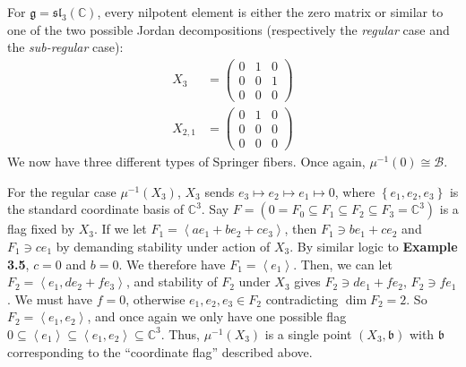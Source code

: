 \documentclass[11pt]{article}
\newcommand{\C}{\mathbb{C}}
\theoremstyle{definition}
\numberwithin{equation}{section} %
\begin{document}
\begin{example}
    For $\mathfrak{g} = \mathfrak{sl}_3(\C)$, every nilpotent element is either the zero matrix or similar to one of the two possible Jordan decompositions (respectively the \emph{regular} case and the \emph{sub-regular} case):
    \begin{align*}
    X_3 &= \begin{pmatrix} 0 & 1 & 0 \\ 0 & 0 & 1 \\ 0 & 0 & 0 \end{pmatrix} \\ 
    X_{2,1} &= \begin{pmatrix} 0 & 1 & 0 \\ 0 & 0 & 0 \\ 0 & 0 & 0 \end{pmatrix}
    \end{align*}
    We now have three different types of Springer fibers. Once again, $\mu^{-1}(0) \cong \mathcal{B}$. 
    
    \smallskip
    
    \noindent For the regular case $\mu^{-1}\left(X_3\right)$, $X_3$ sends $e_3\mapsto e_2 \mapsto e_1 \mapsto 0$, where $\left\{e_1,e_2,e_3\right\}$ is the standard coordinate basis of $\C^3$. Say $F=\left(0 = F_0\subseteq F_1\subseteq F_2\subseteq F_3 = \C^3\right)$ is a flag fixed by $X_3$. If we let $F_1 = \left\langle ae_1+be_2+ce_3\right\rangle$, then $F_1 \ni be_1 + ce_2$ and $F_1\ni ce_1$ by demanding stability under action of $X_3$. By similar logic to \textbf{Example 3.5}, $c=0$ and $b=0$. We therefore have $F_1 = \left\langle e_1\right\rangle$. Then, we can let $F_2 = \left\langle e_1, de_2+fe_3\right\rangle$, and stability of $F_2$ under $X_3$ gives $F_2 \ni de_1 + fe_2$, $F_2 \ni fe_1$. We must have $f=0$, otherwise $e_1,e_2,e_3\in F_2$ contradicting $\dim F_2 = 2$. So $F_2 = \left\langle e_1,e_2\right\rangle$, and once again we only have one possible flag $0\subseteq \left\langle e_1\right\rangle \subseteq \left\langle e_1,e_2\right\rangle\subseteq \C^3$. Thus, $\mu^{-1}\left(X_3\right)$ is a single point $\left(X_3, \mathfrak{b}\right)$ with $\mathfrak{b}$ corresponding to the ``coordinate flag'' described above. 

    \smallskip


\end{example}
\end{document}
